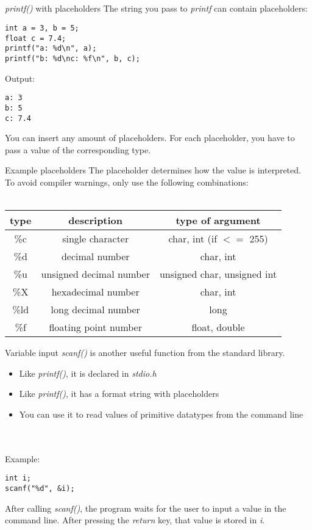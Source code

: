\subsection{}
\begin{frame}[fragile]{\textit{printf()} with placeholders}
	The string you pass to \textit{printf} can contain placeholders:
	\begin{lstlisting}[numbers=none]
int a = 3, b = 5;
float c = 7.4;
printf("a: %d\n", a);
printf("b: %d\nc: %f\n", b, c);
\end{lstlisting}
Output:\begin{lstlisting}[numbers=none]
a: 3
b: 5
c: 7.4
\end{lstlisting}
You can insert any amount of placeholders. For each placeholder, you have to pass a value of the corresponding type.
\end{frame}
\begin{frame}{Example placeholders}
	The placeholder determines how the value is interpreted.
	To avoid compiler warnings, only use the following combinations: \\ \ \\
	\begin{tabular}{|c|c|c|}
		\hline
		\textbf{type} & \textbf{description} & \textbf{type of argument} \\\hline
		\%c & single character & char, int (if $<=$ 255) \\\hline
		\%d & decimal number & char, int \\\hline
		\%u & unsigned decimal number & unsigned char, unsigned int \\\hline
		\%X & hexadecimal number & char, int \\\hline
		\%ld & long decimal number & long \\\hline
		\%f & floating point number & float, double \\\hline
	\end{tabular}
\end{frame}
\begin{frame}[fragile]{Variable input}
	\textit{scanf()} is another useful function from the standard library.
	\begin{itemize}
		\item Like \textit{printf()}, it is declared in \textit{stdio.h}
		\item Like \textit{printf()}, it has a format string with placeholders
		\item You can use it to read values of primitive datatypes from the command line
	\end{itemize}
	\ \\ \ \\ Example:
	\begin{lstlisting}[numbers=none]
int i;
scanf("%d", &i);	
\end{lstlisting}
	After calling \textit{scanf()}, the program waits for the user to input a value in the command line.
	After pressing the \textit{return} key, that value is stored in \textit{i}.
\end{frame}
